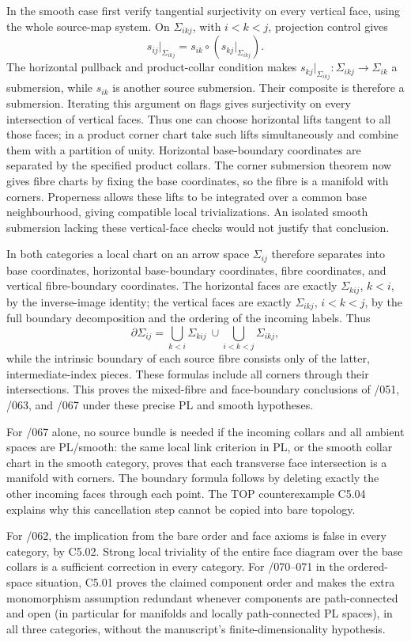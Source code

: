 In the smooth case first verify tangential surjectivity on every vertical face, using the whole source-map system. On \(\Sigma_{ikj}\), with \(i<k<j\), projection control gives \[
 s_{ij}|_{\Sigma_{ikj}}
   =s_{ik}\circ(s_{kj}|_{\Sigma_{ikj}}).
\] The horizontal pullback and product-collar condition makes \(s_{kj}|_{\Sigma_{ikj}}:\Sigma_{ikj}\to\Sigma_{ik}\) a submersion, while \(s_{ik}\) is another source submersion. Their composite is therefore a submersion. Iterating this argument on flags gives surjectivity on every intersection of vertical faces. Thus one can choose horizontal lifts tangent to all those faces; in a product corner chart take such lifts simultaneously and combine them with a partition of unity. Horizontal base-boundary coordinates are separated by the specified product collars. The corner submersion theorem now gives fibre charts by fixing the base coordinates, so the fibre is a manifold with corners. Properness allows these lifts to be integrated over a common base neighbourhood, giving compatible local trivializations. An isolated smooth submersion lacking these vertical-face checks would not justify that conclusion.

In both categories a local chart on an arrow space \(\Sigma_{ij}\) therefore separates into base coordinates, horizontal base-boundary coordinates, fibre coordinates, and vertical fibre-boundary coordinates. The horizontal faces are exactly \(\Sigma_{kij}\), \(k<i\), by the inverse-image identity; the vertical faces are exactly \(\Sigma_{ikj}\), \(i<k<j\), by the full boundary decomposition and the ordering of the incoming labels. Thus \[
 \partial\Sigma_{ij}
 =\bigcup_{k<i}\Sigma_{kij}
   \ \cup\!
   \bigcup_{i<k<j}\Sigma_{ikj},
\] while the intrinsic boundary of each source fibre consists only of the latter, intermediate-index pieces. These formulas include all corners through their intersections. This proves the mixed-fibre and face-boundary conclusions of /051, /063, and /067 under these precise PL and smooth hypotheses.

For /067 alone, no source bundle is needed if the incoming collars and all ambient spaces are PL/smooth: the same local link criterion in PL, or the smooth collar chart in the smooth category, proves that each transverse face intersection is a manifold with corners. The boundary formula follows by deleting exactly the other incoming faces through each point. The TOP counterexample C5.04 explains why this cancellation step cannot be copied into bare topology.

For /062, the implication from the bare order and face axioms is false in every category, by C5.02. Strong local triviality of the entire face diagram over the base collars is a sufficient correction in every category. For /070--071 in the ordered-space situation, C5.01 proves the claimed component order and makes the extra monomorphism assumption redundant whenever components are path-connected and open (in particular for manifolds and locally path-connected PL spaces), in all three categories, without the manuscript's finite-dimensionality hypothesis.

